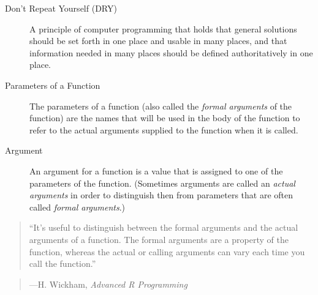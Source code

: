 \documentclass[]{book}
\theoremstyle{definition}
\theoremstyle{definition}
\theoremstyle{definition}
\theoremstyle{remark}
\begin{document}
{\begin{description}
\item[Don't Repeat Yourself (DRY) ]
A principle of computer programming that holds that general solutions
should be set forth in one place and usable in many places, and that
information needed in many places should be defined authoritatively in
one place.
\item[Parameters of a Function ]
The parameters of a function (also called the \emph{formal arguments} of
the function) are the names that will be used in the body of the
function to refer to the actual arguments supplied to the function when
it is called.
\item[Argument ]
An argument for a function is a value that is assigned to one of the
parameters of the function. (Sometimes arguments are called an
\emph{actual arguments} in order to distinguish then from parameters
that are often called \emph{formal arguments}.)
\end{description}

\begin{quote}
``It's useful to distinguish between the formal arguments and the actual
arguments of a function. The formal arguments are a property of the
function, whereas the actual or calling arguments can vary each time you
call the function.''
\end{quote}

\begin{quote}
---H. Wickham, \emph{Advanced R Programming}
\end{quote}

}
\end{document}

